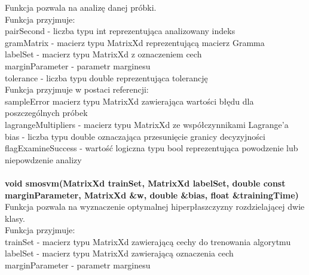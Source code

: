 \documentclass[[10pt,a4paper]{article}
\begin{document}
\newline
\vspace{3mm}Funkcja pozwala na analizę danej próbki.\\
\vspace{3mm}Funkcja przyjmuje:\\
pairSecond - liczba typu int reprezentująca analizowany indeks \\
gramMatrix - macierz typu MatrixXd reprezentującą macierz Gramma\\
labelSet - macierz typu MatrixXd z oznaczeniem cech\\
marginParameter - parametr marginesu \\
tolerance - liczba typu double reprezentująca tolerancję\\
\newline
\vspace{3mm}Funkcja przyjmuje w postaci referencji:\\
sampleError macierz typu MatrixXd zawierająca wartości błędu dla poszczególnych próbek\\
lagrangeMultipliers - macierz typu MatrixXd ze współczynnikami Lagrange'a\\
bias - liczba typu double oznaczająca przesunięcie granicy decyzyjności\\
flagExamineSuccess - wartość logiczna typu bool reprezentująca powodzenie lub niepowdzenie analizy\\
\newline
\newline
\newline
{}\\
\newline
\textbf {void smosvm(MatrixXd trainSet, MatrixXd labelSet, double const marginParameter, MatrixXd \&w, double \&bias, float \&trainingTime)}\\
\newline
\vspace{3mm}Funkcja pozwala na wyznaczenie optymalnej hiperpłaszczyzny rozdzielającej dwie klasy.\\
\vspace{3mm}Funkcja przyjmuje:\\
trainSet - macierz typu MatrixXd zawierającą cechy do trenowania algorytmu\\
labelSet - macierz typu MatrixXd zawierającą oznaczenia cech\\
marginParameter - parametr marginesu \\
\newline
\end{document}

